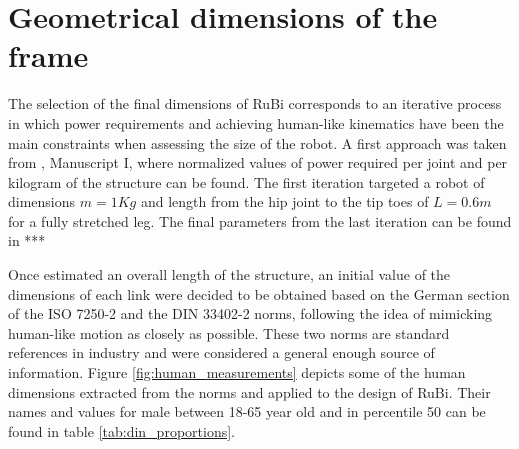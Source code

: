 
\section{Geometrical dimensions of the frame} %
\label{sec:dimensions}
The selection of the final dimensions of RuBi corresponds to an iterative process in which power requirements and achieving human-like kinematics have been the main constraints when assessing the size of the robot.
A first approach was taken from \cite{grimmer}, Manuscript I, where normalized values of power required per joint and per kilogram of the structure can be found.
The first iteration targeted a robot of dimensions $m = 1Kg$ and length from the hip joint to the tip toes of $L = 0.6 m$ for a fully stretched leg.
The final parameters from the last iteration can be found in ***%

Once estimated an overall length of the structure, an initial value of the dimensions of each link were decided to be obtained based on the German section of the ISO 7250-2 \cite{iso_measurements} and the DIN 33402-2 \cite{din_measurements1} norms, following the idea of mimicking human-like motion as closely as possible.
These two norms are standard references in industry and were considered a general enough source of information.
Figure \ref{fig:human_measurements} depicts some of the human dimensions extracted from the norms and applied to the design of RuBi.
Their names and values for male between 18-65 year old and in percentile 50 can be found in table \ref{tab:din_proportions}.

